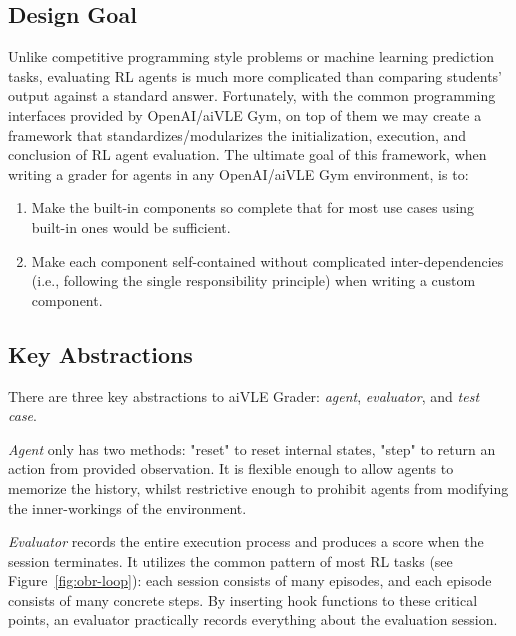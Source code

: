 \subsection{Design Goal}
Unlike competitive programming style problems or machine learning prediction tasks, evaluating RL agents is much more complicated than comparing students’ output against a standard answer. Fortunately, with the common programming interfaces provided by OpenAI/aiVLE Gym, on top of them we may create a framework that standardizes/modularizes the initialization, execution, and conclusion of RL agent evaluation. The ultimate goal of this framework, when writing a grader for agents in any OpenAI/aiVLE Gym environment, is to:
\begin{enumerate}
    \item Make the built-in components so complete that for most use cases using built-in ones would be sufficient.
    \item Make each component self-contained without complicated inter-dependencies (i.e., following the single responsibility principle) when writing a custom component.
\end{enumerate}

\subsection{Key Abstractions}
There are three key abstractions to aiVLE Grader: \textit{agent}, \textit{evaluator}, and \textit{test case}.

\textit{Agent} only has two methods: "reset" to reset internal states, "step" to return an action from provided observation. It is flexible enough to allow agents to memorize the history, whilst restrictive enough to prohibit agents from modifying the inner-workings of the environment.

\textit{Evaluator} records the entire execution process and produces a score when the session terminates. It utilizes the common pattern of most RL tasks (see Figure~\ref{fig:obr-loop}): each session consists of many episodes, and each episode consists of many concrete steps. By inserting hook functions to these critical points, an evaluator practically records everything about the evaluation session. 


